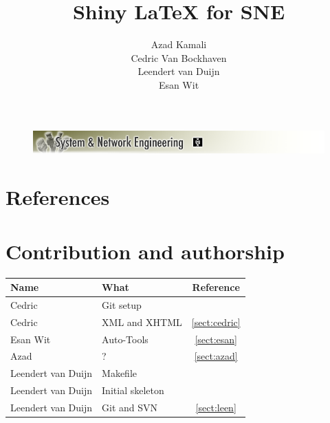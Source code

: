 \documentclass[a4paper,11pt] {article}
\title{Shiny \LaTeX{} for SNE\vspace{10pt}}
\author{
Azad Kamali\\
Cedric Van Bockhaven\\
Leendert van Duijn\\
Esan Wit\\
\vspace{10pt}
}
\begin{document}
\begin{titlepage}
	\enlargethispage{10cm}
	\begin{figure}[h]
	\includegraphics[width=1.0\textwidth]{images/SNELogo.png}
	\end{figure}
	{\let\newpage\relax\maketitle}
\end{titlepage}

\tableofcontents
\newpage






\appendix
\section{References}



\section{Contribution and authorship}
\begin{tabular}{|l | l| c|}
\hline
Name& What&Reference\\
\hline

Cedric& Git setup&\\
Cedric&XML and XHTML&\ref{sect:cedric}\\
\hline
Esan Wit&Auto-Tools&\ref{sect:esan}\\
\hline
Azad& ? &\ref{sect:azad}\\
\hline
Leendert van Duijn& Makefile&\\
Leendert van Duijn& Initial skeleton&\\
Leendert van Duijn& Git and SVN&\ref{sect:leen}\\
\hline
\end{tabular}
\end{document}
